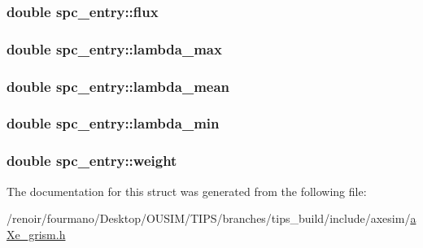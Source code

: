 \label{structspc__entry_a68d27286e09aa4efa3acc087b171c125}
\hypertarget{structspc__entry_ab9baf671046970b64bc5e209815ef3ba}{
\subsubsection[{flux}]{\setlength{\rightskip}{0pt plus 5cm}double {\bf spc\_\-entry::flux}}}
\label{structspc__entry_ab9baf671046970b64bc5e209815ef3ba}
\hypertarget{structspc__entry_ad03114ac70ff73ea0fb8d5d1d36e991e}{
\subsubsection[{lambda\_\-max}]{\setlength{\rightskip}{0pt plus 5cm}double {\bf spc\_\-entry::lambda\_\-max}}}
\label{structspc__entry_ad03114ac70ff73ea0fb8d5d1d36e991e}
\hypertarget{structspc__entry_afabeeb9b94d4d47d65ade75c6ff82adc}{
\subsubsection[{lambda\_\-mean}]{\setlength{\rightskip}{0pt plus 5cm}double {\bf spc\_\-entry::lambda\_\-mean}}}
\label{structspc__entry_afabeeb9b94d4d47d65ade75c6ff82adc}
\hypertarget{structspc__entry_a834d349c0cc41820b2435c394a23b9b5}{
\subsubsection[{lambda\_\-min}]{\setlength{\rightskip}{0pt plus 5cm}double {\bf spc\_\-entry::lambda\_\-min}}}
\label{structspc__entry_a834d349c0cc41820b2435c394a23b9b5}
\hypertarget{structspc__entry_abb44f7d3d364666f7e64850cc1d05375}{
\subsubsection[{weight}]{\setlength{\rightskip}{0pt plus 5cm}double {\bf spc\_\-entry::weight}}}
\label{structspc__entry_abb44f7d3d364666f7e64850cc1d05375}


The documentation for this struct was generated from the following file:\begin{DoxyCompactItemize}
\item 
/renoir/fourmano/Desktop/OUSIM/TIPS/branches/tips\_\-build/include/axesim/\hyperlink{aXe__grism_8h}{aXe\_\-grism.h}\end{DoxyCompactItemize}
